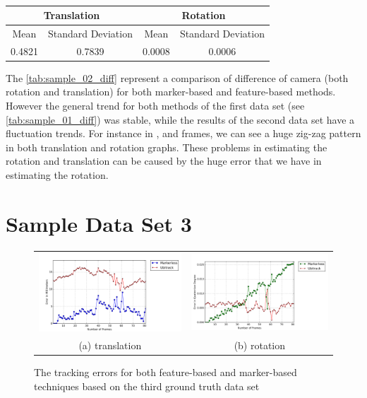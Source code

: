 \begin{table}[H]
\centering
  \begin{tabular}{| c | c | c | c |}
      \hline
      \multicolumn{2}{|c|}{Translation} & \multicolumn{2}{c}{Rotation} \\ \hline
       Mean & Standard Deviation & Mean & Standard Deviation \\ \hline
      0.4821 & 0.7839 & 0.0008 & 0.0006 \\ \hline
  \end{tabular}
  \caption{} \label{tab:sample_02_diff}
\end{table}

The \autoref{tab:sample_02_diff} represent a comparison of difference of camera (both rotation and translation) for both marker-based and feature-based methods. However the general trend for both methods of the first data set (see \autoref{tab:sample_01_diff}) was stable, while the results of the second data set have a fluctuation trends. For instance in ,  and  frames, we can see a huge zig-zag pattern in both translation and rotation graphs. These problems in estimating the rotation and translation can be caused by the huge error that we have in estimating the rotation. 

\section{Sample Data Set 3} \label{subsec:sample_3}
\begin{figure}[H]
\begin{tabular}{cc}
  \includegraphics[width=80mm]{figures/frame_600/graph_translation} &  \includegraphics[width=80mm]{figures/frame_600/graph_rotation} \\
(a) translation & (b) rotation \\[6pt]
\end{tabular}
\caption{The tracking errors for both feature-based and marker-based techniques based on the third ground truth data set}\label{fig:sample_03}
\end{figure}

